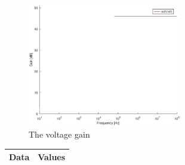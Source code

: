 \begin{figure}[H] \centering
	\includegraphics[width=0.6\textwidth]{gain.eps}
	\caption{The voltage gain}
	\label{fig:voltage_gain}
\end{figure}

\begin{table}[H]
	\centering
	\begin{tabular}{|l|l|} 
		\hline
		Data             & Values                               \\ 
		\hline
		
	\end{tabular}
\end{table}


